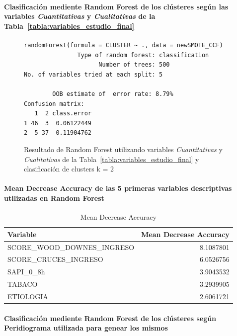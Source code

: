 \paragraph{Clasificación mediente Random Forest de los clústeres según las variables \textit{Cuantitativas} y \textit{Cualitativas} de la Tabla~\ref{tabla:variables_estudio_final}}

\begin{figure}[H]
    \centering
    \begin{lstlisting}[frame=single, basicstyle=\small\ttfamily]
        randomForest(formula = CLUSTER ~ ., data = newSMOTE_CCF) 
               Type of random forest: classification
                     Number of trees: 500
No. of variables tried at each split: 5

        OOB estimate of  error rate: 8.79%
Confusion matrix:
   1  2 class.error
1 46  3  0.06122449
2  5 37  0.11904762
    \end{lstlisting}
    \caption{Resultado de Random Forest utilizando variables \textit{Cuantitativas} y \textit{Cualitativas} de la Tabla~\ref{tabla:variables_estudio_final} y clasificación de clusters k = 2}\label{fig:random_forest_ccf_result_1}
\end{figure}

\paragraph{Mean Decrease Accuracy de las 5 primeras variables descriptivas utilizadas en Random Forest}

\begin{table}[H]
    \centering
    \begin{tabular}{lr}
        \toprule
        \textbf{Variable} & \textbf{Mean Decrease Accuracy} \\
        \midrule
        SCORE\_WOOD\_DOWNES\_INGRESO & 8.1087801 \\
        SCORE\_CRUCES\_INGRESO & 6.0526756 \\
        SAPI\_0\_8h & 3.9043532 \\
        TABACO & 3.2939905 \\
        ETIOLOGIA & 2.6061721 \\
        \bottomrule
    \end{tabular}
    \caption{Mean Decrease Accuracy}
\end{table}

\paragraph{Clasificación mediente Random Forest de los clústeres según Peridiograma utilizada para genear los mismos} 

